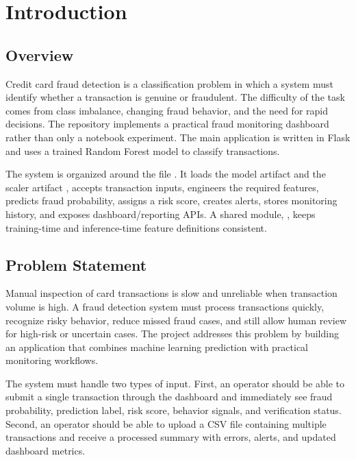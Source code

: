 \documentclass[12pt,a4paper]{report}
\begin{document}
\listoftables
\newpage

\setcounter{page}{1}

\chapter{Introduction}

\section{Overview}
Credit card fraud detection is a classification problem in which a system must identify whether a transaction is genuine or fraudulent. The difficulty of the task comes from class imbalance, changing fraud behavior, and the need for rapid decisions. The repository implements a practical fraud monitoring dashboard rather than only a notebook experiment. The main application is written in Flask and uses a trained Random Forest model to classify transactions.

The system is organized around the file . It loads the model artifact  and the scaler artifact , accepts transaction inputs, engineers the required features, predicts fraud probability, assigns a risk score, creates alerts, stores monitoring history, and exposes dashboard/reporting APIs. A shared module, , keeps training-time and inference-time feature definitions consistent.

\section{Problem Statement}
Manual inspection of card transactions is slow and unreliable when transaction volume is high. A fraud detection system must process transactions quickly, recognize risky behavior, reduce missed fraud cases, and still allow human review for high-risk or uncertain cases. The project addresses this problem by building an application that combines machine learning prediction with practical monitoring workflows.

The system must handle two types of input. First, an operator should be able to submit a single transaction through the dashboard and immediately see fraud probability, prediction label, risk score, behavior signals, and verification status. Second, an operator should be able to upload a CSV file containing multiple transactions and receive a processed summary with errors, alerts, and updated dashboard metrics.
\end{document}

